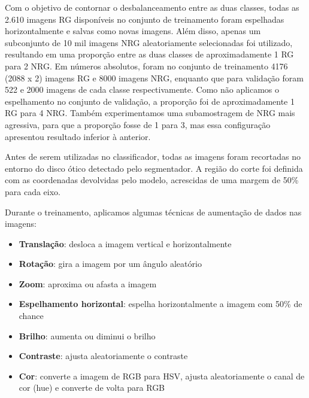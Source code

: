 \documentclass[12pt]{article}
\begin{document}

Com o objetivo de contornar o desbalanceamento entre as duas classes, todas as 2.610 imagens RG disponíveis no conjunto de treinamento foram espelhadas horizontalmente e salvas como novas imagens. Além disso, apenas um subconjunto de 10 mil imagens NRG aleatoriamente selecionadas foi utilizado, resultando em uma proporção entre as duas classes de aproximadamente 1 RG para 2 NRG. Em números absolutos, foram no conjunto de treinamento 4176 (2088 x 2) imagens RG e 8000 imagens NRG, enquanto que para validação foram 522 e 2000 imagens de cada classe respectivamente. Como não aplicamos o espelhamento no conjunto de validação, a proporção foi de aproximadamente 1 RG para 4 NRG. Também experimentamos uma subamostragem de NRG mais agressiva, para que a proporção fosse de 1 para 3, mas essa configuração apresentou resultado inferior à anterior.

Antes de serem utilizadas no classificador, todas as imagens foram recortadas no entorno do disco ótico detectado pelo segmentador. A região do corte foi definida com as coordenadas devolvidas pelo modelo, acrescidas de uma margem de 50\% para cada eixo.


Durante o treinamento, aplicamos algumas técnicas de aumentação de dados nas imagens:

\begin{itemize}[noitemsep]
    \item \textbf{Translação}: desloca a imagem vertical e horizontalmente
    \item \textbf{Rotação}: gira a imagem por um ângulo aleatório
    \item \textbf{Zoom}: aproxima ou afasta a imagem
    \item \textbf{Espelhamento horizontal}: espelha horizontalmente a imagem com 50\% de chance
    \item \textbf{Brilho}: aumenta ou diminui o brilho
    \item \textbf{Contraste}: ajusta aleatoriamente o contraste
    \item \textbf{Cor}: converte a imagem de RGB para HSV, ajusta aleatoriamente o canal de cor (hue) e converte de volta para RGB
\end{itemize}
\end{document}
